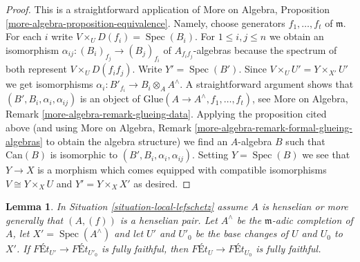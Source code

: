 \documentclass{stacks-project}
\theoremstyle{plain}
\newtheorem{lemma}[subsection]{Lemma}
\theoremstyle{definition}
\theoremstyle{remark}
\numberwithin{equation}{subsection}
\def\Spec{\mathop{\mathrm{Spec}}}
\begin{document}
\begin{proof}
This is a straightforward application of
More on Algebra, Proposition \ref{more-algebra-proposition-equivalence}.
Namely, choose generators $f_1, \ldots, f_t$ of $\mathfrak m$.
For each $i$ write $V \times_U D(f_i) = \Spec(B_i)$.
For $1 \leq i, j \leq n$ we obtain an isomorphism
$\alpha_{ij} : (B_i)_{f_j} \to (B_j)_{f_i}$ of $A_{f_if_j}$-algebras
because the spectrum of both represent $V \times_U D(f_if_j)$.
Write $Y' = \Spec(B')$. Since $V \times_U U' = Y \times_{X'} U'$
we get isomorphisms $\alpha_i : B'_{f_i} \to B_i \otimes_A A^\wedge$.
A straightforward argument shows that $(B', B_i, \alpha_i, \alpha_{ij})$
is an object of $\text{Glue}(A \to A^\wedge, f_1, \ldots, f_t)$, see
More on Algebra, Remark \ref{more-algebra-remark-glueing-data}.
Applying the proposition cited above (and using
More on Algebra, Remark \ref{more-algebra-remark-formal-glueing-algebras}
to obtain the algebra structure) we find an $A$-algebra $B$ such that
$\text{Can}(B)$ is isomorphic to $(B', B_i, \alpha_i, \alpha_{ij})$.
Setting $Y = \Spec(B)$ we see that $Y \to X$ is a morphism
which comes equipped with compatible isomorphisms
$V \cong Y \times_X U$ and $Y' = Y \times_X X'$ as desired.
\end{proof}

\begin{lemma}
\label{lemma-fully-faithful-henselian-completion}
In Situation \ref{situation-local-lefschetz} assume $A$ is henselian
or more generally that $(A, (f))$ is a henselian pair.
Let $A^\wedge$ be the $\mathfrak m$-adic completion of $A$,
let $X' = \Spec(A^\wedge)$ and let $U'$ and $U'_0$ be the base changes of
$U$ and $U_0$ to $X'$. If $\textit{F\'Et}_{U'} \to \textit{F\'Et}_{U'_0}$
is fully faithful, then $\textit{F\'Et}_U \to \textit{F\'Et}_{U_0}$
is fully faithful.
\end{lemma}
\end{document}
